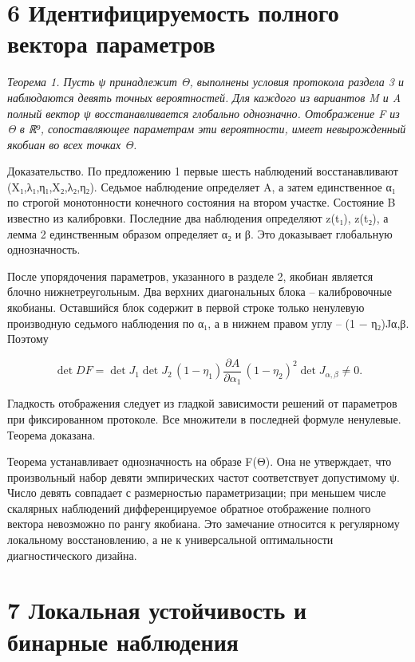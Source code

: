 \documentclass[11pt,a4paper]{article}
\begin{document}
\section*{6 Идентифицируемость полного вектора параметров}

\textit{Теорема 1. Пусть ψ принадлежит Θ, выполнены условия протокола раздела 3 и наблюдаются девять точных вероятностей. Для каждого из вариантов M и A полный вектор ψ восстанавливается глобально однозначно. Отображение F из Θ в ℝ⁹, сопоставляющее параметрам эти вероятности, имеет невырожденный якобиан во всех точках Θ.}\par

Доказательство. По предложению 1 первые шесть наблюдений восстанавливают (X₁,λ₁,η₁,X₂,λ₂,η₂). Седьмое наблюдение определяет A, а затем единственное α₁ по строгой монотонности конечного состояния на втором участке. Состояние B известно из калибровки. Последние два наблюдения определяют z(t₁), z(t₂), а лемма 2 единственным образом определяет α₂ и β. Это доказывает глобальную однозначность.\par

После упорядочения параметров, указанного в разделе 2, якобиан является блочно нижнетреугольным. Два верхних диагональных блока – калибровочные якобианы. Оставшийся блок содержит в первой строке только ненулевую производную седьмого наблюдения по α₁, а в нижнем правом углу – (1 − η₂)Jα,β. Поэтому\par

\begin{equation}\det DF=\det J_1\det J_2\,(1-\eta_1)\frac{\partial A}{\partial\alpha_1}\,(1-\eta_2)^2\det J_{\alpha,\beta}\ne0.\end{equation}

Гладкость отображения следует из гладкой зависимости решений от параметров при фиксированном протоколе. Все множители в последней формуле ненулевые. Теорема доказана.\par

Теорема устанавливает однозначность на образе F(Θ). Она не утверждает, что произвольный набор девяти эмпирических частот соответствует допустимому ψ. Число девять совпадает с размерностью параметризации; при меньшем числе скалярных наблюдений дифференцируемое обратное отображение полного вектора невозможно по рангу якобиана. Это замечание относится к регулярному локальному восстановлению, а не к универсальной оптимальности диагностического дизайна.\par

\section*{7 Локальная устойчивость и бинарные наблюдения}
\end{document}
